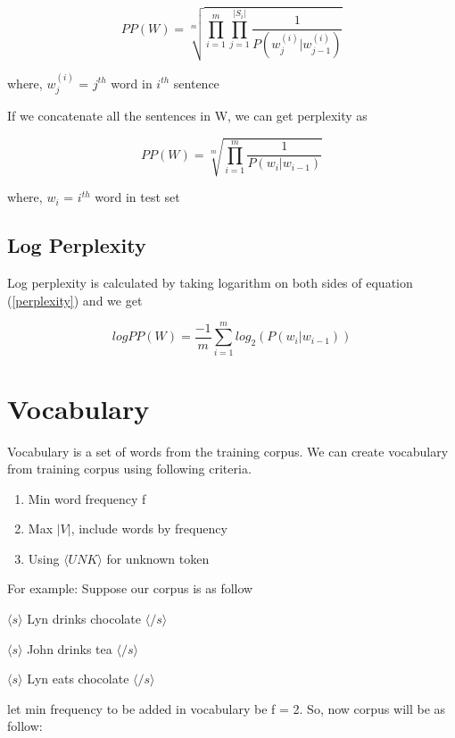 \begin{equation}
	PP(W) = \sqrt[m]{\prod_{i = 1}^{m} \prod_{j = 1}^{|S_i|} \frac{1}{P(w_j^{(i)} | w_{j - 1}^{(i)})}}
\end{equation}

where,
$w_j^{(i)}$ = $j^{th}$ word in $i^{th}$ sentence

If we concatenate all the sentences in W, we can get perplexity as

\begin{equation}\label{perplexity}
	PP(W) = \sqrt[m]{\prod_{i = 1}^{m} \frac{1}{P(w_i | w_{i - 1})}}
\end{equation}

where, $w_i$ = $i^{th}$ word in test set

\subsection{Log Perplexity}
Log perplexity is calculated by taking logarithm on both sides of equation (\ref{perplexity}) and we get

\begin{equation}
	logPP(W) = \frac{-1}{m} \sum_{i = 1}^{m} log_2 (P(w_i | w_{i - 1}))
\end{equation}

\section{Vocabulary}
Vocabulary is a set of words from the training corpus. We can create vocabulary from training corpus using following criteria.

\begin{enumerate}
	\item Min word frequency f
	\item Max $|V|$, include words by frequency
	\item Using $\langle UNK \rangle$ for unknown token
\end{enumerate}

For example: Suppose our corpus is as follow

$\langle s \rangle$ Lyn drinks chocolate $\langle /s \rangle$

$\langle s \rangle$ John drinks tea $\langle /s \rangle$

$\langle s \rangle$ Lyn eats chocolate $\langle /s \rangle$

let min frequency to be added in vocabulary be f = 2. So, now corpus will be as follow:



